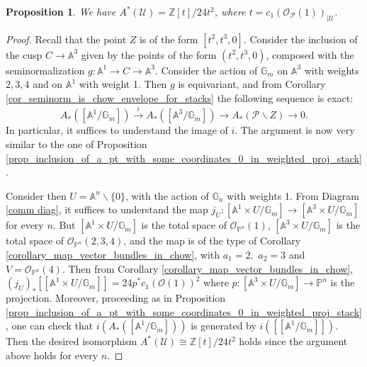 \documentclass[11pt]{amsart}
\newtheorem{prop}[theorem]{Proposition}
\theoremstyle{definition}
\theoremstyle{remark}
\newcommand{\bP}{{\mathbb P}}
\newcommand{\calO}{\mathcal O}
\newcommand{\calU}{\mathcal U}
\newcommand{\calP}{\mathcal P}
\newcommand{\bG}{\mathbb{G}}
\begin{document}
\begin{prop}\label{prop_chow_ring_of_U}
We have $A^*(\calU) = \mathbb{Z}[t]/24t^2$, where $t=c_1(\calO_{\calP}(1))_{|\calU}$. 
\end{prop}
\begin{proof}
Recall that the point $Z$ is of the form $[t^2,t^3,0]$.
Consider the inclusion of the cusp $C\to \mathbb{A}^3$ given by the points of the form $(t^2,t^3,0)$, composed with the seminormalization
$g:\mathbb{A}^1\to C\to \mathbb{A}^3$. Consider the action of $\bG_m$ on $\mathbb{A}^3$
with weights $2,3,4$ and on $\mathbb{A}^1$ with weight 1. Then $g$ is equivariant, and from Corollary \ref{cor_seminorm_is_chow_envelope_for_stacks} the following sequence is exact:
$$A_*([\mathbb{A}^1/\bG_m]) \xrightarrow{i} A_*([\mathbb{A}^3/\bG_m])\to A_*(\calP\smallsetminus Z) \to 0.$$ 
In particular, it suffices to understand the image of $i$. The argument is now very similar to the one of Proposition \ref{prop_inclusion_of_a_pt_with_some_coordinates_0_in_weighted_proj_stack}.

Consider then $U = \mathbb{A}^n\smallsetminus \{0\}$, with the action of $\mathbb{G}_n$ with weights 1. From Diagram \ref{comm diag}, it suffices to understand the map $j_U:[\mathbb{A}^1\times U/\bG_m] \to [\mathbb{A}^3\times U/\bG_m]$ for every $n$. But
$[\mathbb{A}^1\times U/\bG_m] $ is the total space of $\calO_{\mathbb{P}^n}(1)$, $[\mathbb{A}^3\times U/\bG_m] $ is the total space of $\calO_{\mathbb{P}^n}(2,3,4)$, and the map is of the type of
Corollary \ref{corollary_map_vector_bundles_in_chow}, with $a_1 = 2,$ $a_2 = 3$ and $V =\calO_{\mathbb{P}^n}(4) $.
Then from Corollary \ref{corollary_map_vector_bundles_in_chow}, $(j_U)_*[[\mathbb{A}^1\times U/\bG_m]] = 24p^*c_1(\calO(1))^2$ where $p:[\mathbb{A}^3\times U/\bG_m]\to \bP^n$ is the projection. Moreover, proceeding as in Proposition \ref{prop_inclusion_of_a_pt_with_some_coordinates_0_in_weighted_proj_stack}, one can check that $i(A_*([\mathbb{A}^1/\bG_m]))$ is generated by $i([[\mathbb{A}^1/\bG_m]])$.
Then the desired isomorphism
$A^*(\calU) \cong \mathbb{Z}[t]/24t^2$ holds since the argument above holds for every $n$.
\end{proof}
\end{document}
